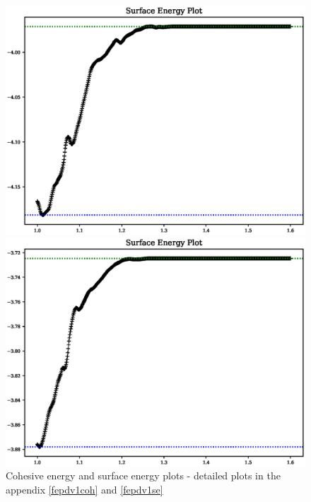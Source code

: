 \begin{figure}[ht]
  \centering
  \begin{minipage}[b]{0.4\linewidth}
    \centering
    \includegraphics[width=.98\linewidth]{chapters/results_potential_fitting/pot_fepd_fcc_1/fe_surface_energy.eps} 
  \end{minipage}%
  \begin{minipage}[b]{0.4\linewidth}
    \centering
    \includegraphics[width=.98\linewidth]{chapters/results_potential_fitting/pot_fepd_fcc_1/pd_surface_energy.eps} 
  \end{minipage}%
	\caption{Cohesive energy and surface energy plots - detailed plots in the appendix \ref{fepdv1coh} and \ref{fepdv1se}}  
\label{fig:v1plots}
\end{figure}
\FloatBarrier

